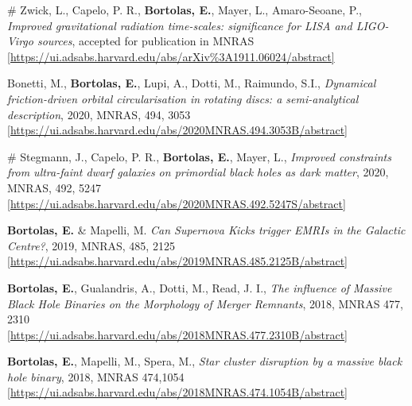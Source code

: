 \begin{etaremune}

\item  \# Zwick, L., Capelo, P. R., \textbf{Bortolas, E.}, Mayer, L., Amaro-Seoane, P., { \it Improved gravitational radiation time-scales: significance for LISA and LIGO-Virgo sources}, accepted for publication in MNRAS \\ \href{https://ui.adsabs.harvard.edu/abs/arXiv\%3A1911.06024/abstract}{\scriptsize [https://ui.adsabs.harvard.edu/abs/arXiv\%3A1911.06024/abstract]}

\item   Bonetti, M., \textbf{Bortolas, E.}, Lupi, A., Dotti, M., Raimundo, S.I., { \it Dynamical friction-driven orbital circularisation in rotating discs: a semi-analytical description}, 2020, MNRAS, 494, 3053 \\ \href{https://ui.adsabs.harvard.edu/abs/2020MNRAS.494.3053B/abstract}{\scriptsize [https://ui.adsabs.harvard.edu/abs/2020MNRAS.494.3053B/abstract]}

\item  \# Stegmann, J., Capelo, P. R.,  {\bf Bortolas, E.}, Mayer, L., { \it Improved constraints from ultra-faint dwarf galaxies on primordial black holes as dark matter}, 2020, MNRAS, 492, 5247\\ \href{https://ui.adsabs.harvard.edu/abs/2020MNRAS.492.5247S/abstract}{\scriptsize [https://ui.adsabs.harvard.edu/abs/2020MNRAS.492.5247S/abstract]}

\item {\bf Bortolas, E.} \& Mapelli, M. { \it Can Supernova Kicks trigger EMRIs in the Galactic Centre?}, 2019, MNRAS, 485, 2125 \\ \href{https://ui.adsabs.harvard.edu/abs/2019MNRAS.485.2125B/abstract}{\scriptsize [https://ui.adsabs.harvard.edu/abs/2019MNRAS.485.2125B/abstract]}

\item {\bf Bortolas, E.}, Gualandris, A., Dotti, M., Read, J. I., { \it The influence of Massive Black Hole Binaries on the Morphology of Merger Remnants},  2018, MNRAS 477, 2310 \\ \href{https://ui.adsabs.harvard.edu/abs/2018MNRAS.477.2310B/abstract}{\scriptsize [https://ui.adsabs.harvard.edu/abs/2018MNRAS.477.2310B/abstract]}

\item {\bf Bortolas, E.}, Mapelli, M., Spera, M., { \it Star cluster disruption by a massive black hole binary}, 2018, MNRAS 474,1054 \\ \href{https://ui.adsabs.harvard.edu/abs/2018MNRAS.474.1054B/abstract}{\scriptsize [https://ui.adsabs.harvard.edu/abs/2018MNRAS.474.1054B/abstract]}


\end{etaremune}
